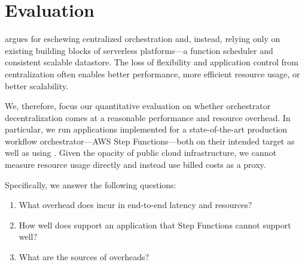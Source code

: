 \section{Evaluation}\label{sec:eval}

\name{} argues for eschewing centralized orchestration and, instead, relying
only on existing building blocks of serverless platforms---a function scheduler
and consistent scalable datastore. The loss of flexibility and application
control from centralization often enables better performance, more efficient
resource usage, or better scalability.

We, therefore, focus our quantitative evaluation on whether orchestrator
decentralization comes at a reasonable performance and resource overhead. In
particular, we run applications implemented for a state-of-the-art
production workflow orchestrator---AWS Step Functions---both on their intended
target as well as using \name{}. Given the opacity of public cloud
infrastructure, we cannot measure resource usage directly and instead use billed
costs as a proxy.

Specifically, we answer the following questions:


\begin{enumerate}

  \item What overhead does \name{} incur in end-to-end latency and resources?

  \item How well does \name{} support an application that Step Functions cannot support well?

  \item What are the sources of  overheads?

\end{enumerate}





